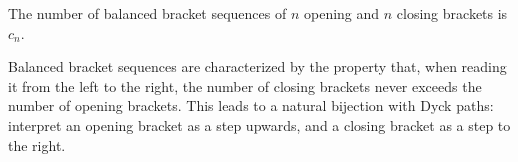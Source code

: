 \begin{page}



\end{page}

\begin{page}
\setcounter{section}{4}
\setcounter{subsection}{5}
\setcounter{dfn}{9}
\label{portion:999}

\begin{cor}
The number of balanced bracket sequences of $n$ opening and $n$ closing brackets is $c_n$.
\end{cor}

\end{page}

\begin{page}
\setcounter{section}{4}
\setcounter{subsection}{6}
\setcounter{dfn}{9}
\label{portion:1000}

Balanced bracket sequences are characterized by the property that,
when reading it from the left to the right, the number of closing brackets never exceeds the number of opening brackets.
This leads to a natural bijection with Dyck paths: interpret an opening bracket as a step upwards, and a closing bracket as a step to the right.



\end{page}

